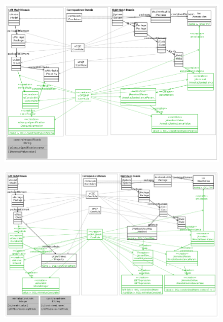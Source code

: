 \documentclass[tuberlin,cic,tc,english,noabntcite]{iiufrgs}
\begin{document}
\begin{figure}[h]
    \caption{}
    \begin{center}
        \includegraphics[width=40em]{uCInv2jCInv}
    \end{center}
    \label{fig:uCInv2jCInv}
\end{figure}
\begin{figure}[h]
    \caption{}
    \begin{center}
        \includegraphics[width=40em]{uCInvInt2jCInvAssert}
    \end{center}
    \label{fig:uCInvInt2jCInvAssert}
\end{figure}
\end{document}
